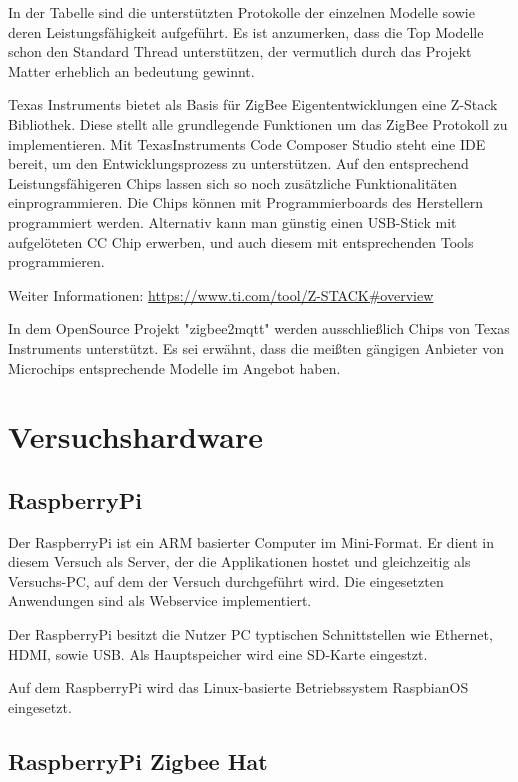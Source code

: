 In der Tabelle sind die unterstützten Protokolle der einzelnen Modelle sowie deren Leistungsfähigkeit aufgeführt.
Es ist anzumerken, dass die Top Modelle schon den Standard Thread unterstützen, der vermutlich durch das
Projekt \grqq Matter\grqq{} erheblich an bedeutung gewinnt.

Texas Instruments bietet als Basis für ZigBee Eigententwicklungen eine Z-Stack Bibliothek. Diese stellt alle grundlegende 
Funktionen um das ZigBee Protokoll zu implementieren. Mit TexasInstruments Code Composer Studio steht eine IDE bereit,
um den Entwicklungsprozess zu unterstützen. Auf den entsprechend Leistungsfähigeren Chips lassen sich so noch zusätzliche
Funktionalitäten einprogrammieren. Die Chips können mit Programmierboards des Herstellern programmiert werden. Alternativ kann man
günstig einen USB-Stick mit aufgelöteten CC Chip erwerben, und auch diesem mit entsprechenden Tools programmieren.

Weiter Informationen: \url{https://www.ti.com/tool/Z-STACK#overview}

In dem OpenSource Projekt "zigbee2mqtt" werden ausschließlich Chips von Texas Instruments unterstützt. Es sei erwähnt, 
dass die meißten gängigen Anbieter von Microchips entsprechende Modelle im Angebot haben. 

\section{Versuchshardware}

\subsection{RaspberryPi}

Der RaspberryPi ist ein ARM basierter Computer im Mini-Format. Er dient in diesem Versuch als Server, der die Applikationen
hostet und gleichzeitig als Versuchs-PC, auf dem der Versuch durchgeführt wird. Die eingesetzten Anwendungen sind 
als Webservice implementiert.

Der RaspberryPi besitzt die Nutzer PC typtischen Schnittstellen wie Ethernet, HDMI, sowie USB. Als Hauptspeicher wird eine
SD-Karte eingestzt. 

Auf dem RaspberryPi wird das Linux-basierte Betriebssystem RaspbianOS eingesetzt. 

\subsection{RaspberryPi Zigbee Hat}

